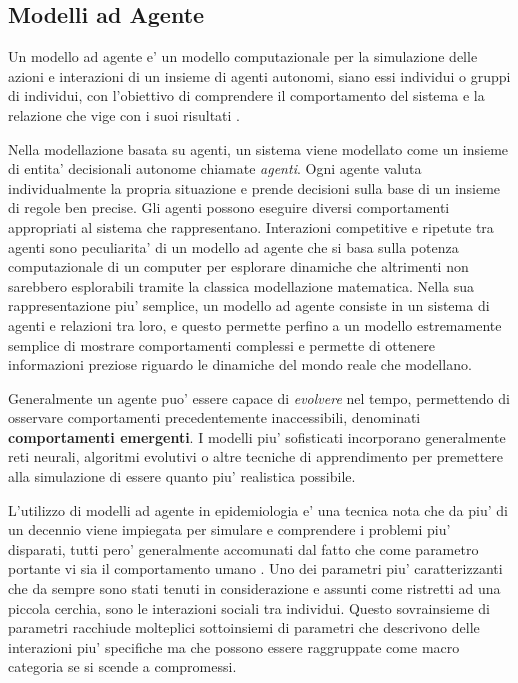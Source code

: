 \subsection{Modelli ad Agente}
Un modello ad agente e' un modello computazionale per la simulazione delle 
azioni e interazioni di un insieme di agenti autonomi, siano essi individui
o gruppi di individui, con l'obiettivo di comprendere il comportamento 
del sistema e la relazione che vige con i suoi risultati \cite{wiki:Agent-based_model}
\cite{7822080}.

Nella modellazione basata su agenti, un sistema viene modellato come un insieme 
di entita' decisionali autonome chiamate \emph{agenti}. Ogni agente valuta 
individualmente la propria situazione e prende decisioni sulla base di un insieme di 
regole ben precise. Gli agenti possono eseguire diversi comportamenti appropriati
al sistema che rappresentano. Interazioni competitive e ripetute tra agenti sono 
peculiarita' di un modello ad agente che si basa sulla potenza computazionale di un 
computer per esplorare dinamiche che altrimenti non sarebbero esplorabili tramite la 
classica modellazione matematica. Nella sua rappresentazione piu' semplice, un modello 
ad agente consiste in un sistema di agenti e relazioni tra loro, e questo permette 
perfino a un modello estremamente semplice di mostrare comportamenti complessi e 
permette di ottenere informazioni preziose riguardo le dinamiche del mondo reale che
modellano. 

Generalmente un agente puo' essere capace di \emph{evolvere} nel tempo, permettendo 
di osservare comportamenti precedentemente inaccessibili, denominati \textbf{comportamenti emergenti}.
I modelli piu' sofisticati incorporano generalmente reti neurali, algoritmi evolutivi o 
altre tecniche di apprendimento per premettere alla simulazione di essere quanto piu' 
realistica possibile.

L'utilizzo di modelli ad agente in epidemiologia e' una tecnica nota che 
da piu' di un decennio viene impiegata per simulare e comprendere 
i problemi piu' disparati, tutti pero' generalmente accomunati
dal fatto che come parametro portante vi sia il comportamento umano \cite{Groff2019}
\cite{El-Sayed2012-ac} \cite{Tracy2018-lc} \cite{Bissett2021}. 
Uno dei parametri piu' caratterizzanti che da sempre sono stati tenuti 
in considerazione e assunti come ristretti ad una piccola cerchia, sono 
le interazioni sociali tra individui. Questo sovrainsieme di parametri 
racchiude molteplici sottoinsiemi di parametri che descrivono delle 
interazioni piu' specifiche ma che possono essere raggruppate come macro 
categoria se si scende a compromessi. 


